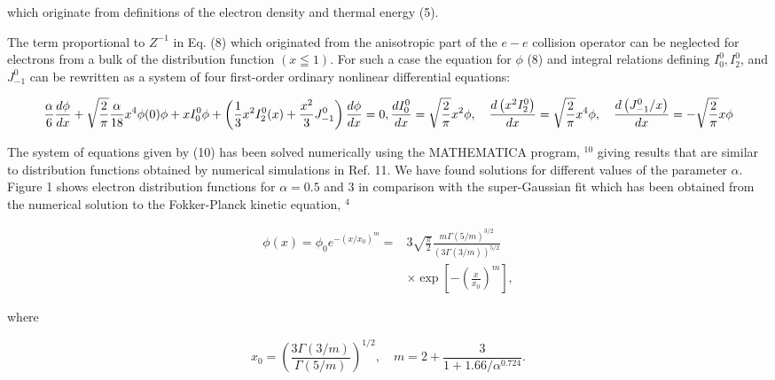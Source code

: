 \documentclass[oneside,onecolumn]{article}
\begin{document}
\begin{sloppypar}
 which originate from definitions of the electron density and thermal energy (5).
 
 The term proportional to $Z^{-1}$ in Eq. (8) which originated from the anisotropic part of the $e-e$ collision operator can be neglected for electrons from a bulk of the distribution function $(x \leqq 1)$. For such a case the equation for $\phi$ (8) and integral relations defining $I_{0}^{0}, I_{2}^{0}$, and $J_{-1}^{0}$ can be rewritten as a system of four first-order ordinary nonlinear differential equations:
 
 
 
 \begin{dmath}[compact]
	\frac{\alpha}{6} \frac{d \phi}{d x}+\sqrt{\frac{2}{\pi}} \frac{\alpha}{18} x^{4} \phi(0) \phi+x I_{0}^{0} \phi
 +\left(\frac{1}{3} x^{2} I_{2}^{0}(x)+\frac{x^{2}}{3} J_{-1}^{0}\right) \frac{d \phi}{d x}=0,\\
 \frac{d I_{0}^{0}}{d x}=\sqrt{\frac{2}{\pi}} x^{2} \phi , \quad \frac{d\left(x^{2} I_{2}^{0}\right)}{d x}=\sqrt{\frac{2}{\pi}} x^{4} \phi , \quad
 \frac{d\left(J_{-1}^{0} / x\right)}{d x}=-\sqrt{\frac{2}{\pi}} x \phi
\end{dmath}
 
 
 The system of equations given by (10) has been solved numerically using the MATHEMATICA program, ${ }^{10}$ giving results that are similar to distribution functions obtained by numerical simulations in Ref. 11. We have found solutions for different values of the parameter $\alpha$. Figure 1 shows electron distribution functions for $\alpha=0.5$ and 3 in comparison with the super-Gaussian fit which has been obtained from the numerical solution to the Fokker-Planck kinetic equation, ${ }^{4}$
 
 \begin{dmath}[compact]
 \begin{aligned}
 \phi(x)=\phi_{0} e^{-\left(x / x_{0}\right)^{m}}= & 3 \sqrt{\frac{\pi}{2}} \frac{m \Gamma(5 / m)^{3 / 2}}{(3 \Gamma(3 / m))^{5 / 2}} \\
 & \times \exp \left[-\left(\frac{x}{x_{0}}\right)^{m}\right],
 \end{aligned}
 \end{dmath}
 
 where
 
 \begin{dmath*}[compact]
 x_{0}=\left(\frac{3 \Gamma(3 / m)}{\Gamma(5 / m)}\right)^{1 / 2}, \quad m=2+\frac{3}{1+1.66 / \alpha^{0.724}} .
 \end{dmath*}
 

\end{sloppypar}
\end{document}
